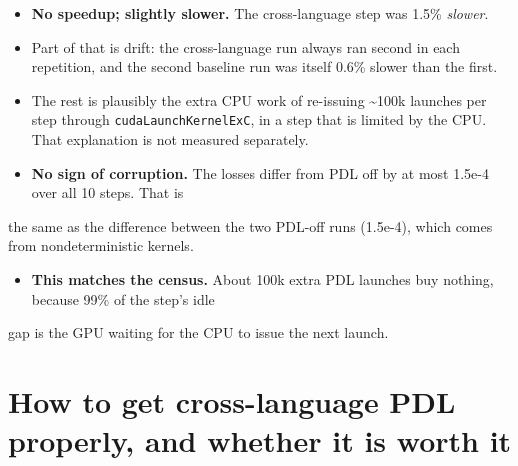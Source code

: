 \documentclass[10pt]{article}
\begin{document}
\begin{itemize}
\item \textbf{No speedup; slightly slower.} The cross-language step was 1.5\% \emph{slower}.
\item Part of that is drift: the cross-language run always ran second in each repetition, and the second baseline run was itself 0.6\% slower than the first.
\item The rest is plausibly the extra CPU work of re-issuing \textasciitilde{}100k launches per step through \texttt{cudaLaunchKernelExC}, in a step that is limited by the CPU. That explanation is not measured separately.
\item \textbf{No sign of corruption.} The losses differ from PDL off by at most 1.5e-4 over all 10 steps. That is
\end{itemize}
the same as the difference between the two PDL-off runs (1.5e-4), which comes from nondeterministic kernels.

\begin{itemize}
\item \textbf{This matches the census.} About 100k extra PDL launches buy nothing, because 99\% of the step's idle
\end{itemize}
gap is the GPU waiting for the CPU to issue the next launch.


\section{How to get cross-language PDL properly, and whether it is worth it}
\end{document}
